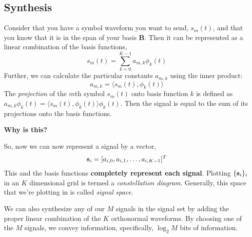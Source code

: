 \subsection{Synthesis}

Consider that you have a symbol waveform you want to send, $s_m(t)$, and that you know that it is in the span of your basis $\mathbf{B}$.  Then it can be represented
as a linear combination of the basis functions,
\[
  s_m(t) = \sum_{k=0}^{K-1} a_{m,k} \phi_k(t)
\]
Further, we can calculate the particular constants $a_{m,k}$ using the inner product:
\[
  a_{m,k} = \langle s_m(t), \phi_k(t) \rangle
\]
The \emph{projection} of the $m$th symbol $s_m(t)$ onto basis function $k$ is
defined as $a_{m,k} \phi_k(t) = \langle s_m(t), \phi_k(t) \rangle
\phi_k(t)$. Then the signal is equal to the sum of its projections
onto the basis functions.

\textbf{Why is this?}


So, now we can now represent a signal by a vector,
\[
  \mathbf{s}_i = [ a_{i,0}, a_{i,1}, \ldots, a_{i,K-1}]^T
\]
This and the basis functions \textbf{completely represent each
signal}. Plotting $\{\mathbf{s}_i\}_i$ in an $K$ dimensional grid is
termed a \emph{constellation diagram}.  Generally, this space that
we're plotting in is called \emph{signal space}.

We can also synthesize any of our $M$ signals in the signal set by
adding the proper linear combination of the $K$ orthonormal waveforms.  By choosing
one of the $M$ signals, we convey information, specifically, $\log_2
M$ bits of information.  



